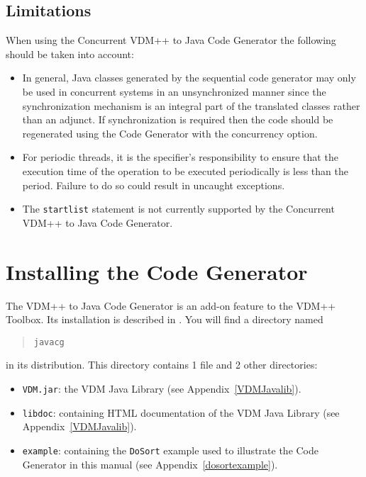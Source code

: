 \documentclass[\pformat,11pt]{article}
\newcommand{\tcg}{the Code Generator}
\newcommand{\cg}{VDM++ to Java Code Generator}
\newcommand{\ccg}{Concurrent \cg}
\newcommand{\JL}{VDM Java Library}
\begin{document}
\subsection{Limitations}
When using the \ccg{} the following should be taken into account:
\begin{itemize}
\item In general, Java classes generated by the sequential code generator
may only be used in concurrent systems in an unsynchronized manner
since the synchronization mechanism is an integral part of the
translated classes rather than an adjunct. If synchronization is
required then the code should be regenerated using \tcg{} with the
concurrency option.

\item For periodic threads, it is the specifier's responsibility to ensure
that the execution time of the operation to be executed periodically
is less than the period. Failure to do so could result in uncaught
exceptions.

\item The \texttt{startlist} statement is not currently supported by the
\ccg. 
\end{itemize}


\appendix


\newpage



\newpage
\section{Installing the Code Generator}
\label{install}

The \cg{} is an add-on feature to the VDM++ Toolbox. Its installation is
described in \cite{InstallPPMan-CSK}. You will find a directory named

\begin{quote}
\begin{verbatim}
javacg
\end{verbatim}
\end{quote}

in its distribution. This directory contains 1 file and 2 other directories:

\begin{itemize}
\item {\tt VDM.jar}: the \JL{} (see Appendix~\ref{VDMJavalib}).
\item {\tt libdoc}: containing HTML documentation of the \JL{} (see Appendix~\ref{VDMJavalib}).
\item {\tt example}: containing the \texttt{DoSort} example used to illustrate the Code Generator in this manual (see Appendix~\ref{dosortexample}).
\end{itemize}
\end{document}
